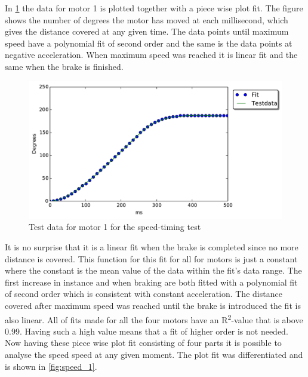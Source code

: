 In \cref{fig:data_fit_1} the data for motor 1 is plotted together with a piece wise plot fit. The figure shows the number of degrees the motor has moved at each millisecond, which gives the distance covered at any given time. The data points until maximum speed have a polynomial fit of second order and the same is the data points at negative acceleration. When maximum speed was reached it is linear fit and the same when the brake is finished.

\begin{figure}[!htb]
    \centering
	\includegraphics[width=1\textwidth]{test_res/speed_tests/Data_and_fit_motor1.pdf}
     \caption{Test data for motor 1 for the speed-timing test}
	\label{fig:data_fit_1}
\end{figure}

It is no surprise that it is a linear fit when the brake is completed since no more distance is covered. This function for this fit for all for motors is just a constant where the constant is the mean value of the data within the fit's data range. The first increase in instance and when braking are both fitted with a polynomial fit of second order which is consistent with constant acceleration. The distance covered after maximum speed was reached until the brake is introduced the fit is also linear. All of fits made for all the four motors have an R\textsuperscript{2}-value that is above 0.99. Having such a high value means that a fit of higher order is not needed. Now having these piece wise plot fit consisting of four parts it is possible to analyse the speed speed at any given moment. The plot fit was differentiated and is shown in \cref{fig:speed_1}.

